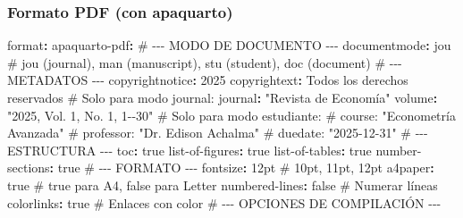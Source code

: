 \documentclass[
  doc,
  floatsintext,
  longtable,
  a4paper,
  nolmodern,
  notxfonts,
  notimes,
  12pt,
  colorlinks=true,linkcolor=blue,citecolor=blue,urlcolor=blue]{apa7}
\newenvironment{Shaded}{\begin{snugshade}}{\end{snugshade}}
\newcommand{\AttributeTok}[1]{\textcolor[rgb]{0.40,0.45,0.13}{#1}}
\newcommand{\CharTok}[1]{\textcolor[rgb]{0.13,0.47,0.30}{#1}}
\newcommand{\CommentTok}[1]{\textcolor[rgb]{0.37,0.37,0.37}{#1}}
\newcommand{\DecValTok}[1]{\textcolor[rgb]{0.68,0.00,0.00}{#1}}
\newcommand{\FunctionTok}[1]{\textcolor[rgb]{0.28,0.35,0.67}{#1}}
\newcommand{\KeywordTok}[1]{\textcolor[rgb]{0.00,0.23,0.31}{\textbf{#1}}}
\newcommand{\StringTok}[1]{\textcolor[rgb]{0.13,0.47,0.30}{#1}}
\begin{document}
\subsubsection{Formato PDF (con
apaquarto)}\label{formato-pdf-con-apaquarto}

\begin{Shaded}
\begin{Highlighting}[]
\FunctionTok{format}\KeywordTok{:}
\AttributeTok{  }\FunctionTok{apaquarto{-}pdf}\KeywordTok{:}
\CommentTok{    \# {-}{-}{-} MODO DE DOCUMENTO {-}{-}{-}}
\AttributeTok{    }\FunctionTok{documentmode}\KeywordTok{:}\AttributeTok{ jou}\CommentTok{  \# jou (journal), man (manuscript), stu (student), doc (document)}
\AttributeTok{    }
\CommentTok{    \# {-}{-}{-} METADATOS {-}{-}{-}}
\AttributeTok{    }\FunctionTok{copyrightnotice}\KeywordTok{:}\AttributeTok{ }\DecValTok{2025}
\AttributeTok{    }\FunctionTok{copyrightext}\KeywordTok{:}\AttributeTok{ Todos los derechos reservados}
\AttributeTok{    }
\CommentTok{    \# Solo para modo journal:}
\AttributeTok{    }\FunctionTok{journal}\KeywordTok{:}\AttributeTok{ }\StringTok{"Revista de Economía"}
\AttributeTok{    }\FunctionTok{volume}\KeywordTok{:}\AttributeTok{ }\StringTok{"2025, Vol. 1, No. 1, 1{-}{-}30"}
\AttributeTok{    }
\CommentTok{    \# Solo para modo estudiante:}
\CommentTok{    \# course: "Econometría Avanzada"}
\CommentTok{    \# professor: "Dr. Edison Achalma"}
\CommentTok{    \# duedate: "2025{-}12{-}31"}
\AttributeTok{    }
\CommentTok{    \# {-}{-}{-} ESTRUCTURA {-}{-}{-}}
\AttributeTok{    }\FunctionTok{toc}\KeywordTok{:}\AttributeTok{ }\CharTok{true}
\AttributeTok{    }\FunctionTok{list{-}of{-}figures}\KeywordTok{:}\AttributeTok{ }\CharTok{true}
\AttributeTok{    }\FunctionTok{list{-}of{-}tables}\KeywordTok{:}\AttributeTok{ }\CharTok{true}
\AttributeTok{    }\FunctionTok{number{-}sections}\KeywordTok{:}\AttributeTok{ }\CharTok{true}
\AttributeTok{    }
\CommentTok{    \# {-}{-}{-} FORMATO {-}{-}{-}}
\AttributeTok{    }\FunctionTok{fontsize}\KeywordTok{:}\AttributeTok{ 12pt}\CommentTok{                        \# 10pt, 11pt, 12pt}
\AttributeTok{    }\FunctionTok{a4paper}\KeywordTok{:}\AttributeTok{ }\CharTok{true}\CommentTok{                         \# true para A4, false para Letter}
\AttributeTok{    }\FunctionTok{numbered{-}lines}\KeywordTok{:}\AttributeTok{ }\CharTok{false}\CommentTok{                 \# Numerar líneas}
\AttributeTok{    }\FunctionTok{colorlinks}\KeywordTok{:}\AttributeTok{ }\CharTok{true}\CommentTok{                      \# Enlaces con color}
\AttributeTok{    }
\CommentTok{    \# {-}{-}{-} OPCIONES DE COMPILACIÓN {-}{-}{-}}

\end{Highlighting}
\end{Shaded}
\end{document}
